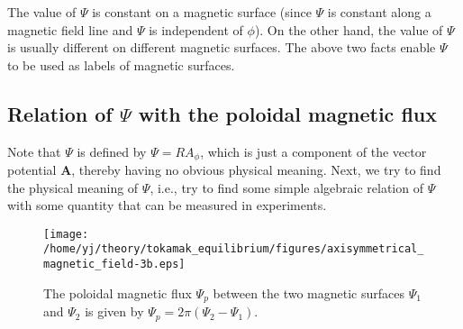 \documentclass{llncs}
\begin{document}
The value of $\Psi$ is constant on a magnetic surface (since $\Psi$ is
constant along a magnetic field line and $\Psi$ is independent of $\phi$). On
the other hand, the value of $\Psi$ is usually different on different magnetic
surfaces. The above two facts enable $\Psi$ to be used as labels of magnetic
surfaces.

\subsection{Relation of $\Psi$ with the poloidal magnetic flux}\label{9-5-5}

Note that $\Psi$ is defined by $\Psi = R A_{\phi}$, which is just a component
of the vector potential $\mathbf{A}$, thereby having no obvious physical
meaning. Next, we try to find the physical meaning of $\Psi$, i.e., try to
find some simple algebraic relation of $\Psi$ with some quantity that can be
measured in experiments.

\begin{figure}[h]
  \texttt{[image: /home/yj/theory/tokamak\_equilibrium/figures/axisymmetrical\_magnetic\_field-3b.eps]}
  \caption{\label{9-8-p1}The poloidal magnetic flux $\Psi_p$ between the two
  magnetic surfaces $\Psi_1$ and $\Psi_2$ is given by $\Psi_p = 2 \pi (\Psi_2
  - \Psi_1)$.}
\end{figure}
\end{document}
